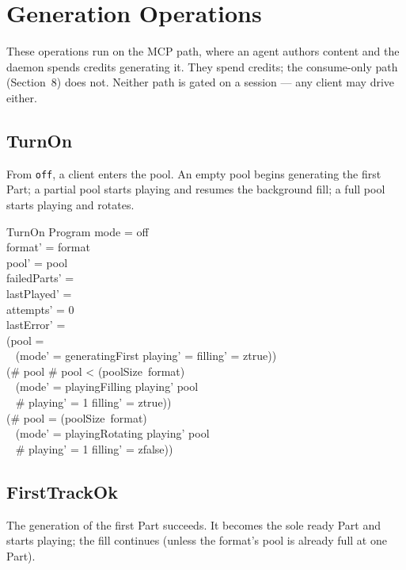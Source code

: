 \documentclass[a4paper,10pt,fleqn]{article}
\begin{document}
\section{Generation Operations}

These operations run on the MCP path, where an agent authors content and the
daemon spends credits generating it. They spend credits; the consume-only path
(Section~8) does not. Neither path is gated on a session --- any client may
drive either.

\subsection{TurnOn}

From \texttt{off}, a client enters the pool. An empty pool begins generating the
first Part; a partial pool starts playing and resumes the background fill; a
full pool starts playing and rotates.

\begin{schema}{TurnOn}
  \Delta Program
  \where
  mode = off \\
  format' = format \\
  pool' = pool \\
  failedParts' = \emptyset \\
  lastPlayed' = \emptyset \\
  attempts' = 0 \\
  lastError' = \emptyset \\
  (pool = \emptyset \implies \\
    \quad~ (mode' = generatingFirst \land playing' = \emptyset \land filling' = ztrue)) \\
  (\# pool  \land \# pool < (poolSize~format) \implies \\
    \quad~ (mode' = playingFilling \land playing' \subseteq pool \\
    \quad~ \land \# playing' = 1 \land filling' = ztrue)) \\
  (\# pool = (poolSize~format) \implies \\
    \quad~ (mode' = playingRotating \land playing' \subseteq pool \\
    \quad~ \land \# playing' = 1 \land filling' = zfalse))
\end{schema}

\subsection{FirstTrackOk}

The generation of the first Part succeeds. It becomes the sole ready Part and
starts playing; the fill continues (unless the format's pool is already full at
one Part).
\end{document}
